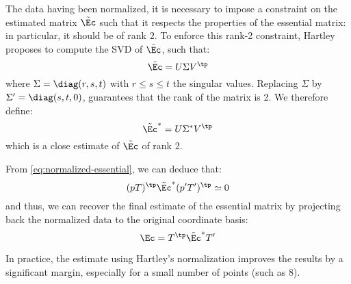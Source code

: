 The data having been normalized, it is necessary to impose a constraint on the estimated matrix $\tilde{\Ec}$ such that it respects the properties of the essential matrix: in particular, it should be of rank $2$. To enforce this rank-2 constraint, Hartley proposes to compute the SVD of $\tilde{\Ec}$, such that:
\begin{equation*}
    \tilde{\Ec} = U\Sigma V^\tp
\end{equation*}
where $\Sigma=\diag(r,s,t)$ with $r\leq s\leq t$ the singular values. Replacing $\Sigma$ by $\Sigma'=\diag(s,t,0)$, guarantees that the rank of the matrix is 2. We therefore define:
\begin{equation*}
    \tilde{\Ec}^* = U\Sigma^* V^\tp
\end{equation*}
which is a close estimate of $\tilde{\Ec}$ of rank 2.

From \autoref{eq:normalized-essential}, we can deduce that:
\begin{equation*}
    (pT)^\tp\tilde{\Ec}^*(p'T')^\tp\simeq0
\end{equation*}
and thus, we can recover the final estimate of the essential matrix by projecting back the normalized data to the original coordinate basis:
\begin{equation*}
    \Ec = T^\tp\tilde{\Ec}^*T'
\end{equation*}

In practice, the estimate using Hartley's normalization improves the results by a significant margin, especially for a small number of points (such as 8).